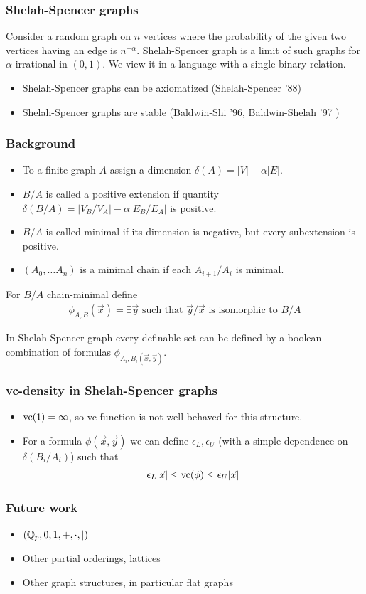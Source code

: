 \documentclass{beamer}
\begin{document}
\begin{frame}
	\frametitle{Shelah-Spencer graphs}
	Consider a random graph on $n$ vertices where the probability of the given two vertices having an edge is $n^{-\alpha}$.
	Shelah-Spencer graph is a limit of such graphs for $\alpha$ irrational in $(0,1)$.
	We view it in a language with a single binary relation.
	\begin{itemize}
		\item Shelah-Spencer graphs can be axiomatized (Shelah-Spencer '88)
		\item Shelah-Spencer graphs are stable (Baldwin-Shi '96, Baldwin-Shelah '97 )
	\end{itemize}
\end{frame}

\begin{frame}
	\frametitle{Background}
\begin{Definition}
	\begin{itemize}
		\item To a finite graph $A$ assign a dimension $\delta(A) = |V| - \alpha |E|$.
		\item $B/A$ is called a positive extension if quantity $\delta(B/A) = |V_B/V_A| - \alpha |E_B/E_A|$ is positive.
		\item $B/A$ is called minimal if its dimension is negative, but every subextension is positive.
		\item $(A_0, \ldots A_n)$ is a minimal chain if each $A_{i + 1}/A_i$ is minimal.
	\end{itemize}
\end{Definition}
	For $B/A$ chain-minimal define
	\begin{align*}
		\phi_{A,B}(\vec x) = \exists \vec y \text { such that $\vec y/\vec x$ is isomorphic to $B/A$}
	\end{align*}
	\begin{Theorem} 
		In Shelah-Spencer graph every definable set can be defined by a boolean combination of formulas $\phi_{A_i, B_i(\vec x, \vec y)}$.
	\end{Theorem}
\end{frame}

\begin{frame}
	\frametitle{vc-density in Shelah-Spencer graphs}
	
	\begin{itemize}
		\item $\operatorname{vc}(1) = \infty$, so vc-function is not well-behaved for this structure.
		\item For a formula $\phi(\vec x, \vec y)$ we can define $\epsilon_L, \epsilon_U$ (with a simple dependence on $\delta(B_i/A_i)$) such that
			\begin{align*}
				\epsilon_L |\vec x| \leq \operatorname{vc}(\phi) \leq \epsilon_U |\vec x|
			\end{align*}
	\end{itemize}
\end{frame}

\begin{frame}
	\frametitle{Future work}
	\begin{itemize}
		\item $(\mathbb{Q}_p, 0, 1, +, \cdot, \mid)$
		\item Other partial orderings, lattices
		\item Other graph structures, in particular flat graphs
	\end{itemize}
\end{frame}
\end{document}
